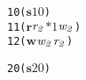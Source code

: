 \newsavebox{\boxtwozerobuffer}
\begin{lrbox}{\boxtwozerobuffer}
\begin{minipage}[t]{0.65\linewidth}
\large
\begin{alltt}
10 (\(\mathbf{s}\) \(\mathit{1 0}\)) 
11 (\(\mathbf{r}\) \(\mathit{r\sb{2}}\) \(\mathit{\ast 1}\) \(\mathit{w\sb{2}}\)) 
12 (\(\mathbf{w}\) \(\mathit{w\sb{2}}\) \(\mathit{r\sb{2}}\))
\end{alltt}
\end{minipage}
\end{lrbox}

\newsavebox{\boxthreezerobuffer}
\begin{lrbox}{\boxthreezerobuffer}
\begin{minipage}[t]{0.65\linewidth}
\large
\begin{alltt}
20 (\(\mathbf{s}\) \(\mathit{2 0}\)) 
\end{alltt}
\end{minipage}
\end{lrbox}


\newcommand\examplefigfive{
\begin{figure*}[tb]
\begin{center}
\setlength{\tabcolsep}{2pt}
\begin{tabular}[t]{c|c|c}
$p_0$ & $p_1$ & $p_2$ \\
\hline
\scalebox{0.8}{\usebox{\boxonezerobuffer}}&
\scalebox{0.8}{\usebox{\boxtwozerobuffer}} &
\scalebox{0.8}{\usebox{\boxthreezerobuffer}}\\
\end{tabular}
\end{center}
\caption{A Deadlock for Zero Buffer Semantics}
\label{fig:zeropattern}
\end{figure*}
}


